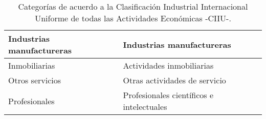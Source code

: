 \begin{description}
\begin{table}[ht]
\begin{tabular}{|l|l|}
			Industrias manufactureras                              & Industrias manufactureras                                                                        \\ \hline
			Inmobiliarias                                          & Actividades inmobiliarias                                                                        \\ \hline
			Otros servicios                                        & Otras actividades de servicio                                                                    \\ \hline
			Profesionales                                          & Profesionales científicos e intelectuales                                                        \\ \hline
		\end{tabular}
		\caption{Categorías de acuerdo a la Clasificación Industrial Internacional Uniforme de todas las Actividades Económicas -CIIU-.}
		\label{tab:categorias}
	\end{table}

\end{description}
